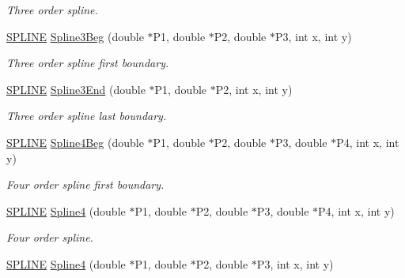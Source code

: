 \begin{DoxyCompactItemize}
\begin{DoxyCompactList}\small\item\em Three order spline. \end{DoxyCompactList}\item 
\hyperlink{structSPLINE}{S\+P\+L\+I\+NE} \hyperlink{classMatematica_aa2836a8f43d770c560eb34c3cafa4ceb}{Spline3\+Beg} (double $\ast$P1, double $\ast$P2, double $\ast$P3, int x, int y)\hypertarget{classMatematica_aa2836a8f43d770c560eb34c3cafa4ceb}{}\label{classMatematica_aa2836a8f43d770c560eb34c3cafa4ceb}

\begin{DoxyCompactList}\small\item\em Three order spline first boundary. \end{DoxyCompactList}\item 
\hyperlink{structSPLINE}{S\+P\+L\+I\+NE} \hyperlink{classMatematica_a9f4d9bbeaf65d0ee820dc906aaee0128}{Spline3\+End} (double $\ast$P1, double $\ast$P2, int x, int y)\hypertarget{classMatematica_a9f4d9bbeaf65d0ee820dc906aaee0128}{}\label{classMatematica_a9f4d9bbeaf65d0ee820dc906aaee0128}

\begin{DoxyCompactList}\small\item\em Three order spline last boundary. \end{DoxyCompactList}\item 
\hyperlink{structSPLINE}{S\+P\+L\+I\+NE} \hyperlink{classMatematica_a4166dfd1c333203677c8caf040ead05b}{Spline4\+Beg} (double $\ast$P1, double $\ast$P2, double $\ast$P3, double $\ast$P4, int x, int y)\hypertarget{classMatematica_a4166dfd1c333203677c8caf040ead05b}{}\label{classMatematica_a4166dfd1c333203677c8caf040ead05b}

\begin{DoxyCompactList}\small\item\em Four order spline first boundary. \end{DoxyCompactList}\item 
\hyperlink{structSPLINE}{S\+P\+L\+I\+NE} \hyperlink{classMatematica_a6b6c8217f2c75492c48cd60e4d9c17cf}{Spline4} (double $\ast$P1, double $\ast$P2, double $\ast$P3, double $\ast$P4, int x, int y)\hypertarget{classMatematica_a6b6c8217f2c75492c48cd60e4d9c17cf}{}\label{classMatematica_a6b6c8217f2c75492c48cd60e4d9c17cf}

\begin{DoxyCompactList}\small\item\em Four order spline. \end{DoxyCompactList}\item 
\hyperlink{structSPLINE}{S\+P\+L\+I\+NE} \hyperlink{classMatematica_aacb11b0728e0fbaaa3597c7e03b562c7}{Spline4} (double $\ast$P1, double $\ast$P2, double $\ast$P3, int x, int y)\hypertarget{classMatematica_aacb11b0728e0fbaaa3597c7e03b562c7}{}\label{classMatematica_aacb11b0728e0fbaaa3597c7e03b562c7}


\end{DoxyCompactItemize}
